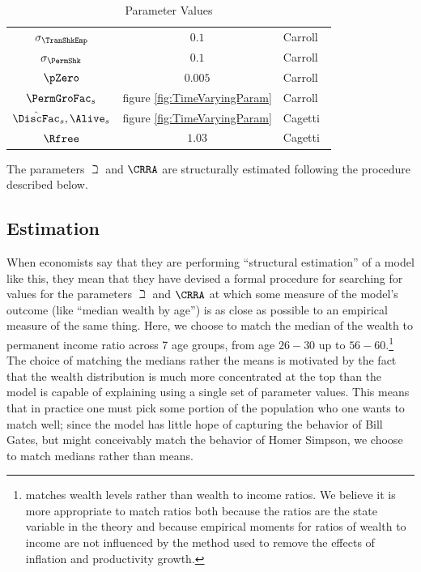 \documentclass[titlepage, headings=optiontotocandhead]{\econtex}
\begin{document}
\begin{table}[h]
  \caption{Parameter Values}\label{table:StrEstParams}
  \begin{center}
    \begin{tabular}{ccl}
      \hline\hline
      $\sigma _{\TranShkEmp}$    & $0.1$ & Carroll~\citeyearpar{carroll:brookings}
      \\ $\sigma _{\PermShk}$   & $0.1$ & Carroll~\citeyearpar{carroll:brookings}
      \\ $\pZero$           & $0.005$  & Carroll~\citeyearpar{carroll:brookings}
      \\ $\PermGroFac_{s}$        & figure \ref{fig:TimeVaryingParam} & Carroll~\citeyearpar{carrollBSLCPIH}
      \\ $\byage{\DiscFac}_{s},\Alive_{s}$ & figure \ref{fig:TimeVaryingParam} & Cagetti~\citeyearpar{cagettiWprofiles}
      \\$\Rfree$            & $1.03$  & Cagetti~\citeyearpar{cagettiWprofiles}\\
      \hline
    \end{tabular}
  \end{center}
\end{table}

The parameters ${\beth}$ and $\CRRA$ are structurally estimated following the procedure described below.

\subsection{Estimation}

When economists say that they are performing ``structural estimation''
of a model like this, they mean that they have devised a
formal procedure for searching for values for the parameters ${\beth}$
and $\CRRA$ at which some measure of the model's outcome (like
``median wealth by age'') is as close as possible to an empirical measure
of the same thing. Here, we choose to match the median of the
wealth to permanent income ratio across 7 age groups, from age $26-30$
up to $56-60$.\footnote{\cite{cagettiWprofiles}
  matches wealth levels rather than wealth to income ratios. We
  believe it is more appropriate to match ratios both because the
  ratios are the state variable in the theory and because empirical
  moments for ratios of wealth to income are not influenced by the
  method used to remove the effects of inflation and productivity
  growth.} The choice of matching the medians rather the means is
motivated by the fact that the wealth distribution is much more
concentrated at the top than the model is capable of explaining using a single
set of parameter values.  This means that in practice one must pick
some portion of the population who one wants to match well; since the
model has little hope of capturing the behavior of Bill Gates, but
might conceivably match the behavior of Homer Simpson, we choose to
match medians rather than means.
\end{document}
